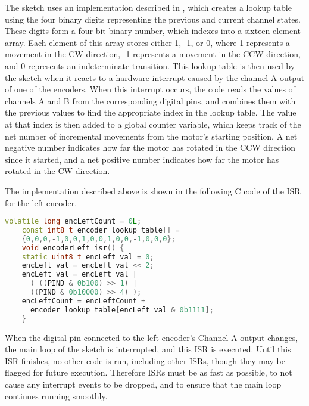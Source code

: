 The sketch uses an implementation described in \cite{encoderBlog}, which creates a lookup table using the four binary digits representing the previous and current channel states. These digits form a four-bit binary number, which indexes into a sixteen element array. Each element of this array stores either 1, -1, or 0, where 1 represents a movement in the CW direction, -1 represents a movement in the CCW direction, and 0 represents an indeterminate transition. This lookup table is then used by the sketch when it reacts to a hardware interrupt caused by the channel A output of one of the encoders. When this interrupt occurs, the code reads the values of channels A and B from the corresponding digital pins, and combines them with the previous values to find the appropriate index in the lookup table. The value at that index is then added to a global counter variable, which keeps track of the net number of incremental movements from the motor's starting position. A net negative number indicates how far the motor has rotated in the CCW direction since it started, and a net positive number indicates how far the motor has rotated in the CW direction. \cite{encoderBlog}

The implementation described above is shown in the following C code of the ISR for the left encoder. \cite{encoderBlog}
\begin{mdframed}[backgroundcolor=light-gray, roundcorner=10pt,leftmargin=1, rightmargin=1, innerleftmargin=15, innertopmargin=15,innerbottommargin=15, outerlinewidth=1, linecolor=light-gray]
	\begin{lstlisting}[language=C++]
	volatile long encLeftCount = 0L;
	const int8_t encoder_lookup_table[] =
	{0,0,0,-1,0,0,1,0,0,1,0,0,-1,0,0,0};
	void encoderLeft_isr() {
	static uint8_t encLeft_val = 0;
	encLeft_val = encLeft_val << 2;
	encLeft_val = encLeft_val |
	  ( ((PIND & 0b100) >> 1) | 
	  ((PIND & 0b10000) >> 4) );
	encLeftCount = encLeftCount +
	  encoder_lookup_table[encLeft_val & 0b1111];
	}
	\end{lstlisting}
\end{mdframed}

When the digital pin connected to the left encoder's Channel A output changes, the main loop of the sketch is interrupted, and this ISR is executed. Until this ISR finishes, no other code is run, including other ISRs, though they may be flagged for future execution. Therefore ISRs must be as fast as possible, to not cause any interrupt events to be dropped, and to ensure that the main loop continues running smoothly.

